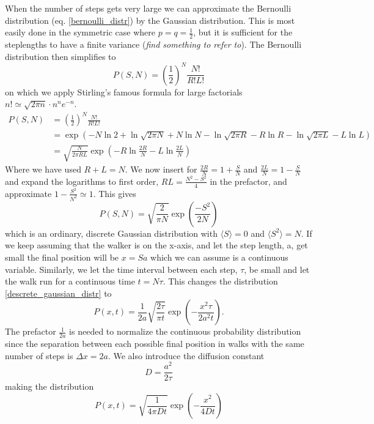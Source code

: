 When the number of steps gets very large we can approximate the Bernoulli distribution (eq. \ref{bernoulli_distr}) by the Gaussian distribution. 
This is most easily done in the symmetric case where $p=q=\frac{1}{2}$, but it is sufficient for the steplengths to have a finite variance (\emph{find something to refer to}). 
The Bernoulli distribution then simplifies to
\begin{equation}
 P(S,N) = \left(\frac{1}{2}\right)^N\frac{N!}{R!L!}
\end{equation}
on which we apply Stirling's famous formula for large factorials $n!\simeq\sqrt{2\pi n}\cdot n^ne^{-n}$.
\begin{align*}
 P(S,N) &= \left(\frac{1}{2}\right)^N\frac{N!}{R!L!} \\
 &= \exp\left(-N\ln2+\ln\sqrt{2\pi N}+N\ln N - \ln\sqrt{2\pi R} -R\ln R - \ln\sqrt{2\pi L} - L\ln L \right) \\
 &= \sqrt{\frac{N}{2\pi RL}}\exp\left(-R\ln\frac{2R}{N}-L\ln\frac{2L}{N}\right)
\end{align*}
Where we have used $R+L=N$. We now insert for $\frac{2R}{N}=1+\frac{S}{N}$ and $\frac{2L}{N}=1-\frac{S}{N}$ and expand the logarithms to first order, $RL=\frac{N^2-S^2}{4}$ in the prefactor, and approximate $1-\frac{S^2}{N^2}\simeq1$. This gives
\begin{equation}\label{descrete_gaussian_distr}
 P(S,N) =\sqrt{\frac{2}{\pi N}}\exp\left(\frac{-S^2}{2N}\right)
\end{equation}
which is an ordinary, discrete Gaussian distribution with $\langle S\rangle = 0$  and $\langle S^2\rangle = N$. 
If we keep assuming that the walker is on the x-axis, and let the step length, a, get small the final position will be $x=Sa$ which we can assume is a continuous variable. 
Similarly, we let the time interval between each step, $\tau$, be small and let the walk run for a continuous time $t=N\tau$. This changes the distribution \ref{descrete_gaussian_distr} to
\begin{equation}
 P(x,t) = \frac{1}{2a}\sqrt{\frac{2\tau}{\pi t}}\exp\left(-\frac{x^2\tau}{2a^2t}\right). 
\end{equation}
The prefactor $\frac{1}{2a}$ is needed to normalize the continuous probability distribution since the separation between each possible final position in walks with the same number of steps is $\Delta x=2a$. 
We also introduce the diffusion constant
\begin{equation}
D = \frac{a^2}{2\tau} 
\end{equation}
making the distribution
\begin{equation}
 P(x,t) = \sqrt{\frac{1}{4\pi Dt}}\exp\left(-\frac{x^2}{4Dt}\right)
\end{equation}

